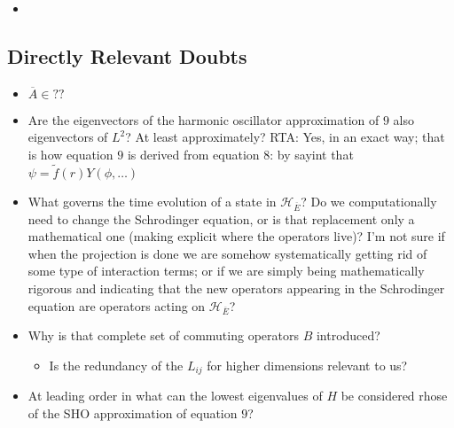 \documentclass{article}
\newcommand{\cut}[1]{\overline{#1}}
\begin{document}
    \begin{itemize}

    \item 
    
    \end{itemize}

\subsection*{Directly Relevant Doubts}

    \begin{itemize}

    \item $\cut A \in ??$
    
    \item Are the eigenvectors of the harmonic oscillator approximation of $9$ also eigenvectors of $L^2$? At least approximately? RTA: Yes, in an exact way; that is how equation $9$ is derived from equation $8$: by sayint that $\psi = \tilde f(r) Y(\phi, \dots)$
    
    \item What governs the time evolution of a state in $\mathcal H_{\cut E}$? Do we computationally need to change the Schrodinger equation, or is that replacement only a mathematical one (making explicit where the operators live)? I'm not sure if when the projection is done we are somehow systematically getting rid of some type of interaction terms; or if we are simply being mathematically rigorous and indicating that the new operators appearing in the Schrodinger equation are operators acting on $\mathcal H_{\cut E}$?
    
    \item Why is that complete set of commuting operators $B$ introduced?
    
        \begin{itemize}
            
        \item Is the redundancy of the $L_{ij}$ for higher dimensions relevant to us?
            
        \end{itemize}
    
    \item At leading order in what can the lowest eigenvalues of $H$ be considered rhose of the SHO approximation of equation $9$?
    
    \end{itemize}
\end{document}
